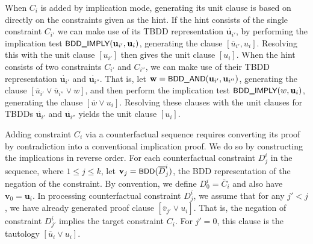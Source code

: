 \documentclass{easychair}
\renewcommand{\obar}[1]{\overline{#1}}
\newcommand{\trust}[1]{\dot {#1}}
\newcommand{\fname}[1]{\mbox{\small\sf #1}}
\newcommand{\node}[1]{\mathbf{#1}}
\newcommand{\nodeu}{\node{u}}
\newcommand{\nodev}{\node{v}}
\newcommand{\nodew}{\node{w}}
\begin{document}
When $C_i$ is added by implication mode, generating its unit clause is
based on directly on the constraints given as the hint.
If the hint consists of the
single constraint $C_{i'}$ we can make use of its TBDD representation
$\trust{\nodeu_{i'}}$, by performing the implication test
$\fname{BDD\_IMPLY}(\nodeu_{i'}, \nodeu_i)$, generating the clause
$[\obar{u}_{i'}, u_i]$.  Resolving this with the unit clause
$[u_{i'}]$ then gives the unit clause $[u_i]$.  When the hint consists
of two constraints $C_{i'}$ and $C_{i''}$, we can make use of their
TBDD representation $\trust{\nodeu_{i'}}$ and $\trust{\nodeu_{i''}}$.
That is, let $\nodew = \fname{BDD\_AND}(\nodeu_{i'}, \nodeu_{i''})$,
generating the clause
$[\obar{u}_{i'} \lor \obar{u}_{i''}  \lor w]$, and then
perform the implication test $\fname{BDD\_IMPLY}(w, \nodeu_i)$, generating the clause $[\obar{w} \lor u_i]$.
Resolving these clauses with the unit clauses for TBDDs
$\trust{\nodeu_{i'}}$ and $\trust{\nodeu_{i''}}$
yields the unit clause $[u_i]$.

Adding constraint $C_i$ via a counterfactual sequence requires
converting its proof by contradiction into a conventional implication
proof.  We do so by constructing the implications in reverse order.
For each counterfactual constraint $D^i_j$ in the
sequence, where $1 \leq j \leq k$, let $\nodev_j =
\fname{BDD}(\obar{D}^i_j)$, the BDD representation of the negation of
the constraint.  By convention, we define $D^i_0 = \obar{C}_i$ and
also have $\nodev_0 = \nodeu_i$.  In processing counterfactual
constraint $D^{i}_j$, we assume that for any $j' < j$, we have already
generated proof clause $[\obar{v}_{j'} \lor u_i]$.  That is, the
negation of constraint $D^{i}_{j'}$ implies the target constraint
$C_i$.  For $j' = 0$, this clause is the tautology $[\obar{u}_i \lor u_i]$.
\end{document}
